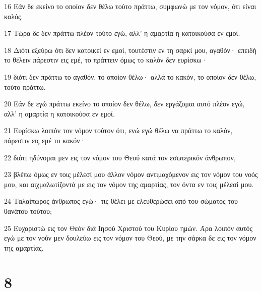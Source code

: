 \par 16 Εάν δε εκείνο το οποίον δεν θέλω τούτο πράττω, συμφωνώ με τον νόμον, ότι είναι καλός.
\par 17 Τώρα δε δεν πράττω πλέον τούτο εγώ, αλλ' η αμαρτία η κατοικούσα εν εμοί.
\par 18 Διότι εξεύρω ότι δεν κατοικεί εν εμοί, τουτέστιν εν τη σαρκί μου, αγαθόν· επειδή το θέλειν πάρεστιν εις εμέ, το πράττειν όμως το καλόν δεν ευρίσκω·
\par 19 διότι δεν πράττω το αγαθόν, το οποίον θέλω· αλλά το κακόν, το οποίον δεν θέλω, τούτο πράττω.
\par 20 Εάν δε εγώ πράττω εκείνο το οποίον δεν θέλω, δεν εργάζομαι αυτό πλέον εγώ, αλλ' η αμαρτία η κατοικούσα εν εμοί.
\par 21 Ευρίσκω λοιπόν τον νόμον τούτον ότι, ενώ εγώ θέλω να πράττω το καλόν, πάρεστιν εις εμέ το κακόν·
\par 22 διότι ηδύνομαι μεν εις τον νόμον του Θεού κατά τον εσωτερικόν άνθρωπον,
\par 23 βλέπω όμως εν τοις μέλεσί μου άλλον νόμον αντιμαχόμενον εις τον νόμον του νοός μου, και αιχμαλωτίζοντά με εις τον νόμον της αμαρτίας, τον όντα εν τοις μέλεσί μου.
\par 24 Ταλαίπωρος άνθρωπος εγώ· τις θέλει με ελευθερώσει από του σώματος του θανάτου τούτου;
\par 25 Ευχαριστώ εις τον Θεόν διά Ιησού Χριστού του Κυρίου ημών. Άρα λοιπόν αυτός εγώ με τον νούν μεν δουλεύω εις τον νόμον του Θεού, με την σάρκα δε εις τον νόμον της αμαρτίας.

\chapter{8}

